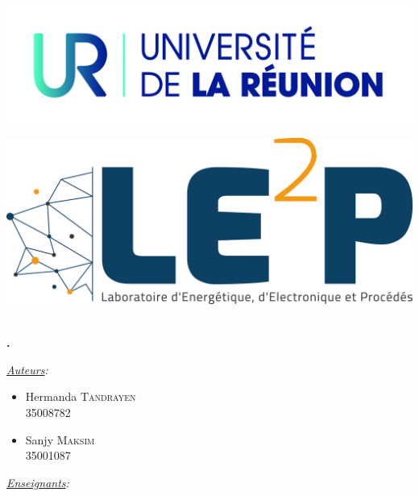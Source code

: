 \documentclass[11pt,oneside]{article}
\begin{document}
\begin{titlepage}
\phantom{aaaaaaaaaaaaaaaaaaaaaaaaaaaaaaaaaaaaaaa
ytrfdytfugvghikuhjbiujbhaaaaaaaaaaaaaaa}


\begin{minipage}[c]{.46\linewidth}
		\centering
		\includegraphics[scale=0.1]{logo} 
	\end{minipage}
\hfill%
\begin{minipage}[c]{.46\linewidth}
		\centering
		\includegraphics[scale=0.04]{LE2P} 
\end{minipage}



\phantom{aaaaaaaaaaaaaaaaaaaaaaaaaaaaaaaaaaaaaaa
ytrfdytfugvghikuhjbiujbhaaaaaaaaaaaaaaa}
\center
\fbox{\begin{minipage}[t][1cm][c]{8cm}
\begin{center}
{\huge \bfseries \textcolor{Rapport}{Feuille de Route}}
\end{center}
\end{minipage}}\\[0.5cm]
\textbf{\Large \color{Mulberry} .}\\[0.5cm] 
\begin{minipage}{0.5\textwidth}
\begin{flushleft} \large
\hspace{0.22\textwidth}\emph{\underline{Auteurs}:}\\
\begin{multicols}{2}
\begin{itemize}[font=\color{airforceblue} \Large, label=, leftmargin=0cm]
\item{Hermanda \textsc{Tandrayen} \\ {\small{35008782}}}
\item{Sanjy \textsc{Maksim} \\ {\small{35001087}}}
\end{itemize}
\end{multicols}
\end{flushleft}
\end{minipage}
\begin{minipage}{0.45\textwidth}
\begin{flushright} \large
\emph{\underline{Enseignants}:}\phantom{aaaaa}\\


\end{flushright}
\end{minipage}
\end{titlepage}
\end{document}

